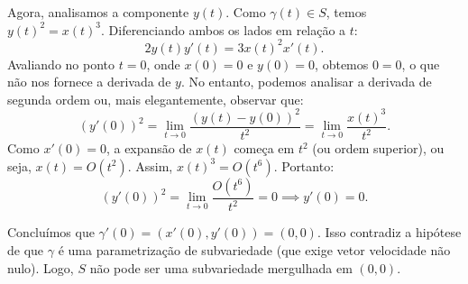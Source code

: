 {	Agora, analisamos a componente $y(t)$. Como $\gamma(t) \in S$, temos $y(t)^2 = x(t)^3$. Diferenciando ambos os lados em relação a $t$:
	\begin{equation*}
		2y(t)y'(t) = 3x(t)^2 x'(t).
	\end{equation*}
	Avaliando no ponto $t=0$, onde $x(0)=0$ e $y(0)=0$, obtemos $0 = 0$, o que não nos fornece a derivada de $y$. No entanto, podemos analisar a derivada de segunda ordem ou, mais elegantemente, observar que:
	\begin{equation*}
		(y'(0))^2 = \lim_{t \to 0} \frac{(y(t)-y(0))^2}{t^2} = \lim_{t \to 0} \frac{x(t)^3}{t^2}.
	\end{equation*}
	Como $x'(0)=0$, a expansão de $x(t)$ começa em $t^2$ (ou ordem superior), ou seja, $x(t) = O(t^2)$. Assim, $x(t)^3 = O(t^6)$. Portanto:
	\begin{equation*}
		(y'(0))^2 = \lim_{t \to 0} \frac{O(t^6)}{t^2} = 0 \implies y'(0) = 0.
	\end{equation*}
	
	Concluímos que $\gamma'(0) = (x'(0), y'(0)) = (0,0)$. Isso contradiz a hipótese de que $\gamma$ é uma parametrização de subvariedade (que exige vetor velocidade não nulo). Logo, $S$ não pode ser uma subvariedade mergulhada em $(0,0)$.
	\begin{center}
	\end{center}
}

